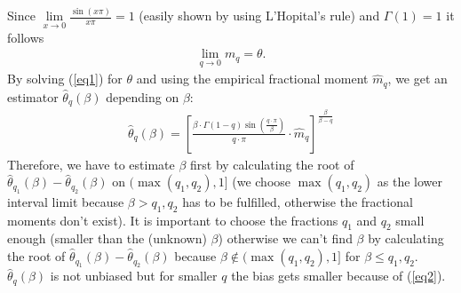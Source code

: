 \documentclass[10pt, a4paper]{article}\usepackage[]{graphicx}\usepackage[]{color}
\renewcommand{\le}{\leqslant} %
\begin{document}
Since $\lim\limits_{x \to 0}\frac{\sin(x\pi)}{x\pi} = 1$ (easily shown by using L'Hopital's rule) and $\Gamma(1)=1$ it follows 
\begin{align} \label{eq2}
	\lim\limits_{q \to 0} m_q = \theta.
\end{align}
By solving (\ref{eq1}) for $\theta$ and using the empirical fractional moment $\hat{m}_q$, we get an estimator $\hat{\theta}_q(\beta)$ depending on $\beta$:
\begin{align}
	\hat{\theta}_q(\beta)=\left[ \frac{\beta \cdot \Gamma(1-q)\sin(\frac{q \cdot \pi}{\beta})}{q \cdot \pi} \cdot \widehat{m}_q \right]^{\frac{\beta}{\beta-q}}
\end{align}
Therefore, we have to estimate $\beta$ first by calculating the root of $\hat{\theta}_{q_1}(\beta)-\hat{\theta}_{q_2}(\beta)$ on $(\max(q_1,q_2),1]$ (we choose $\max(q_1,q_2)$ as the lower interval limit because $\beta>q_1,q_2$ has to be fulfilled, otherwise the fractional moments don't exist). 
It is important to choose the fractions $q_1$ and $q_2$ small enough (smaller than the (unknown) $\beta$) otherwise we can't find $\beta$ by calculating the root of $\hat{\theta}_{q_1}(\beta)-\hat{\theta}_{q_2}(\beta)$ because $\beta \notin (\max(q_1,q_2),1]$ for $\beta \le q_1,q_2$. $\hat{\theta}_q(\beta)$ is not unbiased but for smaller $q$ the bias gets smaller because of (\ref{eq2}).
\end{document}
